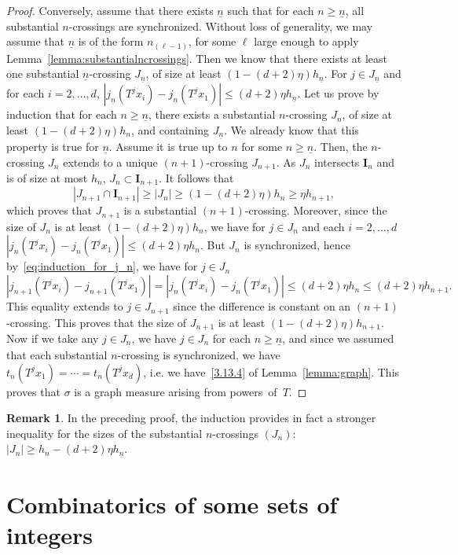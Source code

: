 \documentclass[10pt]{amsart}
\theoremstyle{definition}\newtheorem{defi}[theo]{Definition}\newtheorem{rema}[theo]{Remark}\newtheorem{exam}[theo]{Example}\newtheorem{exem}[theo]{Example}\newtheorem{nota}[theo]{Notation}
\newcommand{\nb}{\underline{n}}
\newcommand{\ci}{\boldsymbol I}
\begin{document}
\begin{proof}
Conversely, assume that there exists $\nb$ such that for each $n\ge\nb$, all substantial $n$-crossings are synchronized. Without loss of generality, we may assume that $\nb$ is of the form $n_{(\ell-1)}$, for some $\ell$ large enough to apply Lemma~\ref{lemma:substantialncrossings}. Then we know that there exists at least one substantial $\nb$-crossing $J_{\nb}$, of size at least $(1-(d+2)\eta)h_{\nb}$. For $j\in J_{\nb}$ and for each $i=2,\ldots,d$, $|j_{\nb}(T^j x_i)-j_{\nb}(T^j x_1)|\le (d+2)\eta h_{\nb}$. Let us prove by induction that for each $n\ge\nb$, there exists a substantial $n$-crossing $J_n$, of size at least $(1-(d+2)\eta)h_n$, and containing $J_{\nb}$. We already know that this property is true for $\nb$. Assume it is true up to $n$ for some $n\ge\nb$. Then, the $n$-crossing $J_n$ extends to a unique $(n+1)$-crossing $J_{n+1}$. As $J_n$ intersects $\ci_n$ and is of size at most $h_n$, $J_n\subset \ci_{n+1}$. It follows that
\[
\left|J_{n+1}\cap \ci_{n+1}\right| \ge \left| J_n \right| \ge (1-(d+2)\eta)h_n \ge \eta h_{n+1},
\]
which proves that $J_{n+1}$ is a substantial $(n+1)$-crossing. Moreover, since the size of $J_n$ is at least $(1-(d+2)\eta)h_n$, we have for $j\in J_n$ and each $i=2,\ldots,d$ $|j_n(T^j x_i)-j_n(T^j x_1)|\le (d+2)\eta h_{n}$. But $J_n$ is synchronized, hence by~\eqref{eq:induction_for_j_n}, we have for $j\in J_n$
\[
|j_{n+1}(T^j x_i)-j_{n+1}(T^j x_1)| = |j_n(T^j x_i)-j_n(T^j x_1)| \le (d+2)\eta h_{n} \le (d+2)\eta h_{n+1}.
\]
This equality extends to $j\in J_{n+1}$ since the difference is constant on an $(n+1)$-crossing. This proves that the size of $J_{n+1}$ is at least $(1-(d+2)\eta)h_{n+1}$. Now if we take any $j\in J_{\nb}$, we have $j\in J_n$ for each $n\ge\nb$, and since we assumed that each substantial $n$-crossing is synchronized, we have $t_n(T^jx_1)=\cdots=t_n(T^jx_d)$, i.e. we have~\eqref{3.13.4} of Lemma~\ref{lemma:graph}. This proves that $\sigma$ is a graph measure arising from powers~of~$T$.
\end{proof}

\begin{rema}\label{remark:sizes}
In the preceding proof, the induction provides in fact a stronger inequality for the sizes of the substantial $n$-crossings $(J_n)$: $|J_n|\ge h_n-(d+2)\eta h_{\nb}$.
\end{rema}


\section{Combinatorics of some sets of integers}\label{sec:combinatorics}
\end{document}
